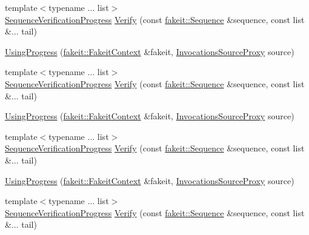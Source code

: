 \begin{DoxyCompactItemize}
{\footnotesize template$<$typename ... list$>$ }\\\mbox{\hyperlink{classfakeit_1_1SequenceVerificationProgress}{Sequence\+Verification\+Progress}} \mbox{\hyperlink{classfakeit_1_1UsingProgress_a56c5d1ecdf4f405a4a85b348e1fad0f1}{Verify}} (const \mbox{\hyperlink{classfakeit_1_1Sequence}{fakeit\+::\+Sequence}} \&sequence, const list \&... tail)
\item 
\mbox{\hyperlink{classfakeit_1_1UsingProgress_ac87db7ffa3ed53507cb2c98c2c0b4ee7}{Using\+Progress}} (\mbox{\hyperlink{structfakeit_1_1FakeitContext}{fakeit\+::\+Fakeit\+Context}} \&fakeit, \mbox{\hyperlink{structfakeit_1_1InvocationsSourceProxy}{Invocations\+Source\+Proxy}} source)
\item 
{\footnotesize template$<$typename ... list$>$ }\\\mbox{\hyperlink{classfakeit_1_1SequenceVerificationProgress}{Sequence\+Verification\+Progress}} \mbox{\hyperlink{classfakeit_1_1UsingProgress_a56c5d1ecdf4f405a4a85b348e1fad0f1}{Verify}} (const \mbox{\hyperlink{classfakeit_1_1Sequence}{fakeit\+::\+Sequence}} \&sequence, const list \&... tail)
\item 
\mbox{\hyperlink{classfakeit_1_1UsingProgress_ac87db7ffa3ed53507cb2c98c2c0b4ee7}{Using\+Progress}} (\mbox{\hyperlink{structfakeit_1_1FakeitContext}{fakeit\+::\+Fakeit\+Context}} \&fakeit, \mbox{\hyperlink{structfakeit_1_1InvocationsSourceProxy}{Invocations\+Source\+Proxy}} source)
\item 
{\footnotesize template$<$typename ... list$>$ }\\\mbox{\hyperlink{classfakeit_1_1SequenceVerificationProgress}{Sequence\+Verification\+Progress}} \mbox{\hyperlink{classfakeit_1_1UsingProgress_a56c5d1ecdf4f405a4a85b348e1fad0f1}{Verify}} (const \mbox{\hyperlink{classfakeit_1_1Sequence}{fakeit\+::\+Sequence}} \&sequence, const list \&... tail)
\item 
\mbox{\hyperlink{classfakeit_1_1UsingProgress_ac87db7ffa3ed53507cb2c98c2c0b4ee7}{Using\+Progress}} (\mbox{\hyperlink{structfakeit_1_1FakeitContext}{fakeit\+::\+Fakeit\+Context}} \&fakeit, \mbox{\hyperlink{structfakeit_1_1InvocationsSourceProxy}{Invocations\+Source\+Proxy}} source)
\item 
{\footnotesize template$<$typename ... list$>$ }\\\mbox{\hyperlink{classfakeit_1_1SequenceVerificationProgress}{Sequence\+Verification\+Progress}} \mbox{\hyperlink{classfakeit_1_1UsingProgress_a56c5d1ecdf4f405a4a85b348e1fad0f1}{Verify}} (const \mbox{\hyperlink{classfakeit_1_1Sequence}{fakeit\+::\+Sequence}} \&sequence, const list \&... tail)

\end{DoxyCompactItemize}
